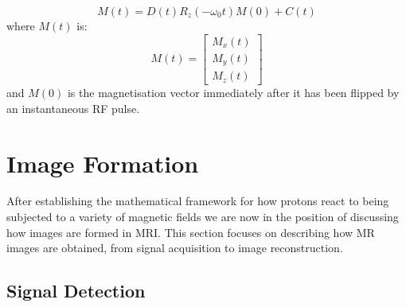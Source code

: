 \begin{equation} \label{eq:444}
    M(t) = D(t) R_z(-\omega_0 t) M(0) + C(t)
\end{equation}
where $M(t)$ is:
\begin{equation}
    M ( t ) = \left[
    \begin{array}{c}
        M_x(t) \\
        M_y(t) \\
        M_z(t)
    \end{array}
    \right]
\end{equation}
and $M(0)$ is the magnetisation vector immediately after it has been flipped by an instantaneous RF pulse.

\section{Image Formation}\label{chapterlabel2sec12}
After establishing the mathematical framework for how protons react to being subjected to a variety of magnetic fields we are now in the position of discussing how images are formed in MRI.
This section focuses on describing how MR images are obtained, from signal acquisition to image reconstruction. 

\hfill

\subsection{Signal Detection}

